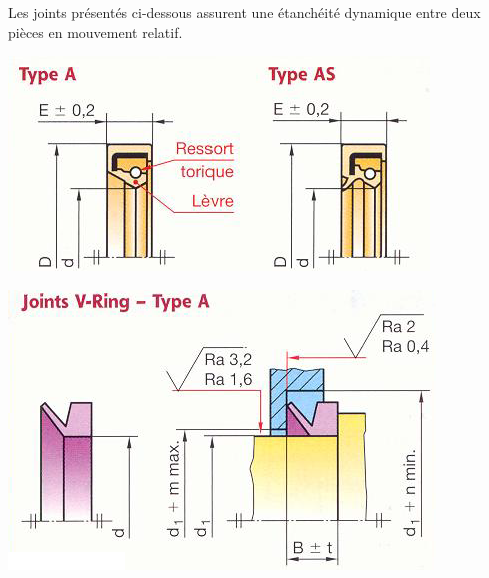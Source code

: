 \documentclass[10pt,oneside]{article}
\begin{document}
Les joints présentés ci-dessous \cite{gdi} assurent une étanchéité dynamique entre deux pièces en mouvement relatif. 
\begin{minipage}[c]{.45\linewidth}
\begin{center}
\includegraphics[width=.95\textwidth]{png/joint_1}

\includegraphics[width=.95\textwidth]{png/joint_2}
\end{center}
\end{minipage}\hfill
\end{document}
